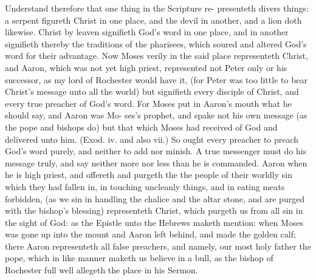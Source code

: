 \documentclass{custom}
\begin{document}
Understand therefore that one thing in the Scripture re- 
presenteth divers things: a serpent figureth Christ in one 
place, and the devil in another, and a lion doth likewise. 
Christ by leaven signifieth God's word in one place, and in 
another signifieth thereby the traditions of the pharisees, 
which soured and altered God's word for their advantage. 
Now Moses verily in the said place representeth Christ, 
and Aaron, which was not yet high priest, represented not
Peter only or his successor, as my lord of Rochester would 
have it, (for Peter was too little to bear Christ's message 
unto all the world) but signifieth every disciple of Christ, and 
every true preacher of God's word. For Moses put in 
Aaron's mouth what he should say, and Aaron was Mo- 
ses's prophet, and spake not his own message (as the pope 
and bishops do) but that which Moses had received of God 
and delivered unto him. (Exod. iv. and also vii.) So ought 
every preacher to preach God's word purely, and neither 
to add nor minish. A true messenger must do his message 
truly, and say neither more nor less than he is commanded. 
Aaron when he is high priest, and offereth and purgeth the 
the people of their worldly sin which they had fallen in, in 
touching uncleanly things, and in eating meats forbidden, 
(as we sin in handling the chalice and the altar stone, and 
are purged with the bishop's blessing) representeth Christ, 
which purgeth us from all sin in the sight of God: as the 
Epistle unto the Hebrews maketh mention: when Moses 
was gone up into the mount and Aaron left behind, and 
made the golden calf; there Aaron representeth all false 
preachers, and namely, our most holy father the pope, 
which in like manner maketh us believe in a bull, as the 
bishop of Rochester full well allegeth the place in his 
Sermon. 
\end{document}
